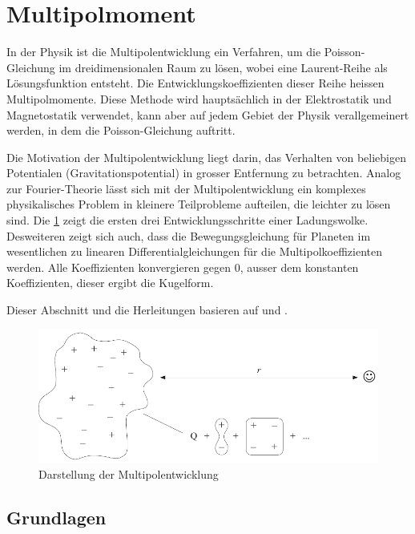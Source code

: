 %
%
%
%
\section{Multipolmoment
\label{planet:section:multipol}}
In der Physik ist die Multipolentwicklung ein Verfahren, um die Poisson-Gleichung im dreidimensionalen Raum zu lösen, wobei eine Laurent-Reihe als Lösungsfunktion entsteht.
Die Entwicklungskoeffizienten dieser Reihe heissen Multipolmomente.
Diese Methode wird hauptsächlich in der Elektrostatik und Magnetostatik verwendet, kann aber auf jedem Gebiet der Physik verallgemeinert werden, in dem die Poisson-Gleichung auftritt.

Die Motivation der Multipolentwicklung liegt darin, das Verhalten von beliebigen Potentialen (Gravitationspotential) in grosser Entfernung zu betrachten.
Analog zur Fourier-Theorie lässt sich mit der Multipolentwicklung ein komplexes physikalisches Problem in kleinere Teilprobleme aufteilen, die leichter zu lösen sind.
Die \cref{planet:fig:multipol} zeigt die ersten drei Entwicklungsschritte einer Ladungswolke.
Desweiteren zeigt sich auch, dass die Bewegungsgleichung für Planeten im wesentlichen zu linearen Differentialgleichungen für die Multipolkoeffizienten werden.
Alle Koeffizienten konvergieren gegen 0, ausser dem konstanten Koeffizienten, dieser ergibt die Kugelform.

Dieser Abschnitt und die Herleitungen basieren auf \cite{planet:multi} und \cite{planet:quadro}.

\begin{figure}[h!]
    \centering
    \includegraphics[width=\linewidth]{papers/planet/pictures/Multipol.pdf}
    \caption{Darstellung der Multipolentwicklung
        \label{planet:fig:multipol}}
\end{figure}

\subsection{Grundlagen
\label{planet:subsection:grundlagen}}

